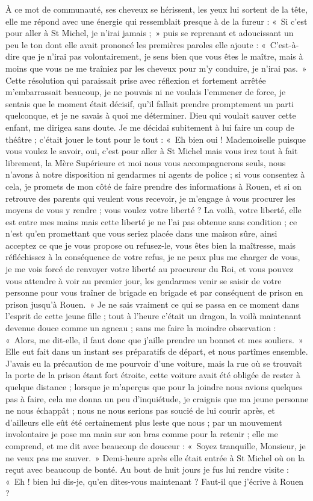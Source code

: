 \documentclass[11pt,a4paper]{report}
\begin{document}
À ce mot de communauté, ses cheveux se hérissent, les yeux lui sortent de la tête, elle me répond avec une énergie qui ressemblait presque à de la fureur : «~Si c'est pour aller à St Michel, je n'irai jamais ;~» puis se reprenant et adoucissant un peu le ton dont elle avait prononcé les premières paroles elle ajoute : «~C'est-à-dire que je n'irai pas volontairement, je sens bien que vous êtes le maître, mais à moins que vous ne me traîniez par les cheveux pour m'y conduire, je n'irai pas.~» Cette résolution qui paraissait prise avec réflexion et fortement arrêtée m'embarrassait beaucoup, je ne pouvais ni ne voulais l'emmener de force, je sentais que le moment était décisif, qu'il fallait prendre promptement un parti quelconque, et je ne savais à quoi me déterminer. Dieu qui voulait sauver cette enfant, me dirigea sans doute. Je me décidai subitement à lui faire un coup de théâtre ; c'était jouer le tout pour le tout : «~Eh bien oui ! Mademoiselle puisque vous voulez le savoir, oui, c'est pour aller à St Michel mais vous irez tout à fait librement, la Mère Supérieure et moi nous vous accompagnerons seuls, nous n'avons à notre disposition ni gendarmes ni agents de police ; si vous consentez à cela, je promets de mon côté de faire prendre des informations à Rouen, et si on retrouve des parents qui veulent vous recevoir, je m'engage à vous procurer les moyens de vous y rendre ; vous voulez votre liberté ? La voilà, votre liberté, elle est entre mes mains mais cette liberté je ne l'ai pas obtenue sans condition ; ce n'est qu'en promettant que vous seriez placée dans une maison sûre, ainsi acceptez ce que je vous propose ou refusez-le, vous êtes bien la maîtresse, mais réfléchissez à la conséquence de votre refus, je ne peux plus me charger de vous, je me vois forcé de renvoyer votre liberté au procureur du Roi, et vous pouvez vous attendre à voir au premier jour, les gendarmes venir se saisir de votre personne pour vous traîner de brigade en brigade et par conséquent de prison en prison jusqu'à Rouen.~» Je ne sais vraiment ce qui se passa en ce moment dans l'esprit de cette jeune fille ; tout à l'heure c'était un dragon, la voilà maintenant devenue douce comme un agneau ; sans me faire la moindre observation : «~Alors, me dit-elle, il faut donc que j'aille prendre un bonnet et mes souliers.~» Elle eut fait dans un instant ses préparatifs de départ, et nous partîmes ensemble. J'avais eu la précaution de me pourvoir d'une voiture, mais la rue où se trouvait la porte de la prison étant fort étroite, cette voiture avait été obligée de rester à quelque distance ; lorsque je m'aperçus que pour la joindre nous avions quelques pas à faire, cela me donna un peu d'inquiétude, je craignis que ma jeune personne ne nous échappât ; nous ne nous serions pas soucié de lui courir après, et d'ailleurs elle eût été certainement plus leste que nous ; par un mouvement involontaire je pose ma main sur son bras comme pour la retenir ; elle me comprend, et me dit avec beaucoup de douceur : «~Soyez tranquille, Monsieur, je ne veux pas me sauver.~» Demi-heure après elle était entrée à St Michel où on la reçut avec beaucoup de bonté. Au bout de huit jours je fus lui rendre visite : «~Eh ! bien lui dis-je, qu'en dites-vous maintenant ? Faut-il que j'écrive à Rouen ?~
\end{document}
